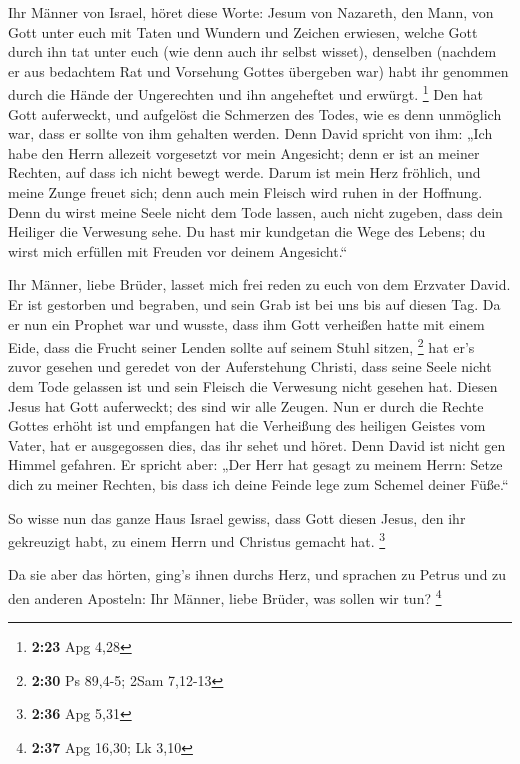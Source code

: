  Ihr Männer von Israel, höret diese Worte: Jesum von
Nazareth, den Mann, von Gott unter euch mit Taten und Wundern und
Zeichen erwiesen, welche Gott durch ihn tat unter euch (wie denn auch
ihr selbst wisset),  denselben (nachdem er aus bedachtem
Rat und Vorsehung Gottes übergeben war) habt ihr genommen durch die
Hände der Ungerechten und ihn angeheftet und erwürgt. \footnote{\textbf{2:23}
  Apg 4,28}  Den hat Gott auferweckt, und aufgelöst die
Schmerzen des Todes, wie es denn unmöglich war, dass er sollte von ihm
gehalten werden.  Denn David spricht von ihm: „Ich habe den
Herrn allezeit vorgesetzt vor mein Angesicht; denn er ist an meiner
Rechten, auf dass ich nicht bewegt werde.  Darum ist mein
Herz fröhlich, und meine Zunge freuet sich; denn auch mein Fleisch wird
ruhen in der Hoffnung.  Denn du wirst meine Seele nicht dem
Tode lassen, auch nicht zugeben, dass dein Heiliger die Verwesung sehe.
 Du hast mir kundgetan die Wege des Lebens; du wirst mich
erfüllen mit Freuden vor deinem Angesicht.``

 Ihr Männer, liebe Brüder, lasset mich frei reden zu euch
von dem Erzvater David. Er ist gestorben und begraben, und sein Grab ist
bei uns bis auf diesen Tag.  Da er nun ein Prophet war und
wusste, dass ihm Gott verheißen hatte mit einem Eide, dass die Frucht
seiner Lenden sollte auf seinem Stuhl sitzen, \footnote{\textbf{2:30} Ps
  89,4-5; 2Sam 7,12-13}  hat er's zuvor gesehen und geredet
von der Auferstehung Christi, dass seine Seele nicht dem Tode gelassen
ist und sein Fleisch die Verwesung nicht gesehen hat. 
Diesen Jesus hat Gott auferweckt; des sind wir alle Zeugen.
 Nun er durch die Rechte Gottes erhöht ist und empfangen
hat die Verheißung des heiligen Geistes vom Vater, hat er ausgegossen
dies, das ihr sehet und höret.  Denn David ist nicht gen
Himmel gefahren. Er spricht aber: „Der Herr hat gesagt zu meinem Herrn:
Setze dich zu meiner Rechten,  bis dass ich deine Feinde
lege zum Schemel deiner Füße.``

 So wisse nun das ganze Haus Israel gewiss, dass Gott
diesen Jesus, den ihr gekreuzigt habt, zu einem Herrn und Christus
gemacht hat. \footnote{\textbf{2:36} Apg 5,31}

 Da sie aber das hörten, ging's ihnen durchs Herz, und
sprachen zu Petrus und zu den anderen Aposteln: Ihr Männer, liebe
Brüder, was sollen wir tun? \footnote{\textbf{2:37} Apg 16,30; Lk 3,10}

